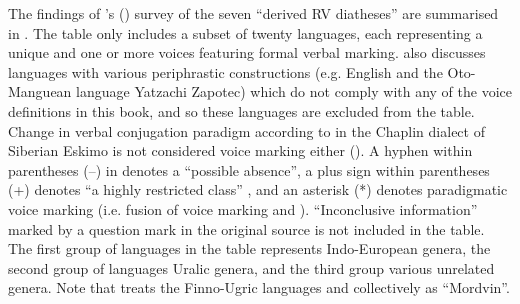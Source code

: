 The findings of \citeauthor{geniusiene:1987}’s (\citeyear[244, 258, 308, 320]{geniusiene:1987}) survey of the seven “derived RV diatheses” are summarised in . The table only includes a subset of twenty languages, each representing a unique  and one or more voices featuring formal verbal marking. \citeauthor{geniusiene:1987} also discusses languages with various periphrastic constructions (e.g. English and the Oto-Manguean language Yatzachi Zapotec) which do not comply with any of the voice definitions in this book, and so these languages are excluded from the table. Change in verbal conjugation paradigm according to  in the Chaplin dialect of Siberian Eskimo is not considered voice marking either (). A hyphen within parentheses (--) in  denotes a “possible absence”, a plus sign within parentheses (+) denotes “a highly restricted class” \citep[353]{geniusiene:1987}, and an asterisk (*) denotes paradigmatic voice marking (i.e. fusion of voice marking and ). “Inconclusive information” marked by a question mark in the original source is not included in the table. The first group of languages in the table represents Indo-European genera, the second group of languages Uralic genera, and the third group various unrelated genera. Note that \citeauthor{geniusiene:1987} treats the Finno-Ugric languages  and  collectively as “Mordvin”.

